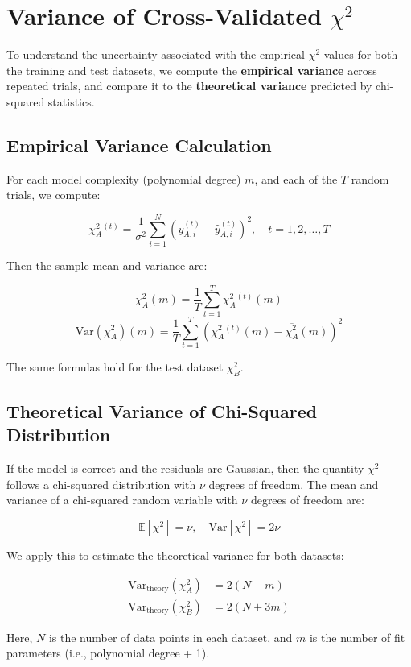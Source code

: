 \documentclass{article}
\begin{document}
\section*{Variance of Cross-Validated $\chi^2$}

To understand the uncertainty associated with the empirical $\chi^2$ values for both the training and test datasets, we compute the \textbf{empirical variance} across repeated trials, and compare it to the \textbf{theoretical variance} predicted by chi-squared statistics.

\subsection*{Empirical Variance Calculation}

For each model complexity (polynomial degree) $m$, and each of the $T$ random trials, we compute:

\[
\chi^2_A^{(t)} = \frac{1}{\sigma^2} \sum_{i=1}^N (y_{A,i}^{(t)} - \hat{y}_{A,i}^{(t)})^2, \quad t = 1, 2, \dots, T
\]

Then the sample mean and variance are:

\[
\overline{\chi^2_A}(m) = \frac{1}{T} \sum_{t=1}^T \chi^2_A^{(t)}(m)
\]
\[
\mathrm{Var}(\chi^2_A)(m) = \frac{1}{T} \sum_{t=1}^T \left( \chi^2_A^{(t)}(m) - \overline{\chi^2_A}(m) \right)^2
\]

The same formulas hold for the test dataset $\chi^2_B$.

\subsection*{Theoretical Variance of Chi-Squared Distribution}

If the model is correct and the residuals are Gaussian, then the quantity $\chi^2$ follows a chi-squared distribution with $\nu$ degrees of freedom. The mean and variance of a chi-squared random variable with $\nu$ degrees of freedom are:

\[
\mathbb{E}[\chi^2] = \nu, \quad \mathrm{Var}[\chi^2] = 2\nu
\]

We apply this to estimate the theoretical variance for both datasets:

\begin{align*}
\mathrm{Var}_{\text{theory}}(\chi^2_A) &= 2(N - m) \\
\mathrm{Var}_{\text{theory}}(\chi^2_B) &= 2(N + 3m)
\end{align*}

Here, $N$ is the number of data points in each dataset, and $m$ is the number of fit parameters (i.e., polynomial degree + 1).
\end{document}
